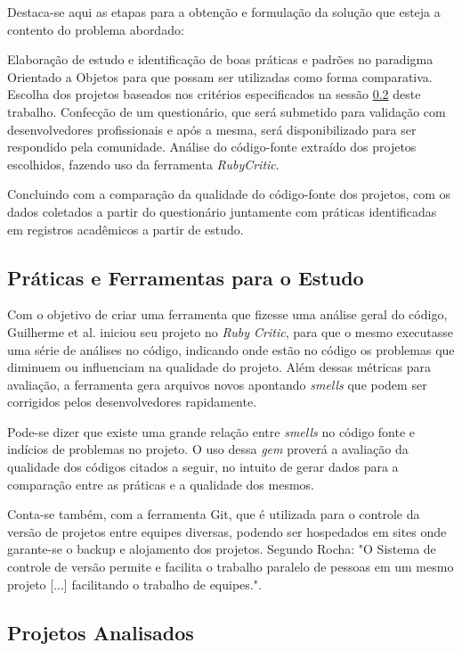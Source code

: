 \documentclass[11pt,a4paper,usenames,dvipsnames]{article}
\begin{document}
Destaca-se aqui as etapas para a obtenção e formulação da solução que esteja a contento do problema abordado:

Elaboração de estudo e identificação de boas práticas e padrões no paradigma Orientado a Objetos para que possam ser utilizadas como forma comparativa. Escolha dos projetos baseados nos critérios especificados na sessão \ref{analised_projects} deste trabalho. Confecção de um questionário, que será submetido para validação com desenvolvedores profissionais e após a mesma, será disponibilizado para ser respondido pela comunidade. Análise do código-fonte extraído dos projetos  escolhidos, fazendo uso da ferramenta \textit{RubyCritic}. 

Concluindo com a comparação da qualidade do código-fonte dos projetos, com os dados coletados a partir do questionário juntamente com práticas identificadas em registros acadêmicos a partir de estudo.

\subsection{Práticas e Ferramentas para o Estudo}

Com o objetivo de criar uma ferramenta que fizesse uma análise geral do código, Guilherme et al. \cite{RC} iniciou seu projeto no \textit{Ruby Critic}, para que o mesmo executasse uma série de análises no código, indicando onde estão no código os problemas que diminuem ou influenciam na qualidade do projeto. Além dessas métricas para avaliação, a ferramenta gera arquivos novos apontando \textit{smells} que podem ser corrigidos pelos desenvolvedores rapidamente.

Pode-se dizer que existe uma grande relação entre \textit{smells} no código fonte e indícios de problemas no projeto\cite{piveta2005bad}. O uso dessa \textit{gem} proverá a avaliação da qualidade dos códigos citados a seguir, no intuito de gerar dados para a comparação entre as práticas e a qualidade dos mesmos.

Conta-se também, com a ferramenta Git, que é utilizada para o controle da versão de projetos entre equipes diversas, podendo ser hospedados em sites onde garante-se o backup e alojamento dos projetos. Segundo Rocha: "O Sistema de controle de versão permite e facilita o trabalho paralelo de pessoas em um mesmo projeto [...] facilitando o trabalho de equipes."\cite{rocha2017integraccao}. 

\subsection{Projetos Analisados}\label{analised_projects}
\end{document}
